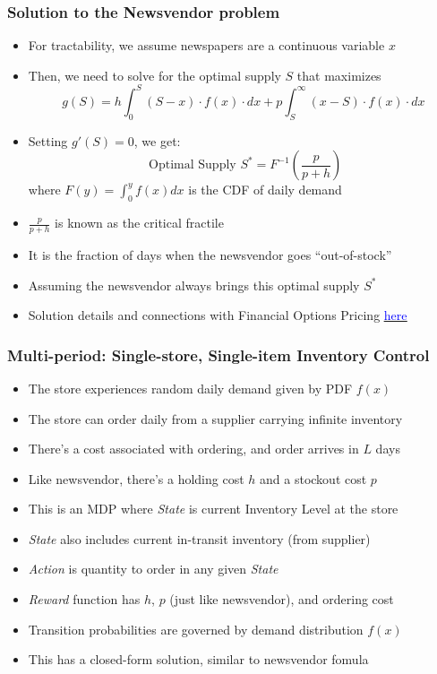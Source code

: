 \documentclass[handout]{beamer}
\begin{document}
\begin{frame}
\frametitle{Solution to the Newsvendor problem}
\pause
\begin{itemize}[<+->]
\item For tractability, we assume newspapers are a continuous variable $x$
\item Then, we need to solve for the optimal supply $S$ that maximizes
$$g(S) = h \int_0^S (S-x) \cdot f(x) \cdot dx + p \int_S^{\infty} (x-S) \cdot f(x) \cdot dx$$
\item Setting $g'(S) =0$, we get:
$$\mbox{ Optimal Supply } S^* = F^{-1}(\frac p {p+h})$$
where $F(y) = \int_0^y f(x) dx$ is the CDF of daily demand
\item $\frac p {p+h}$ is known as the critical fractile
\item It is the fraction of days when the newsvendor goes ``out-of-stock''
\item Assuming the newsvendor always brings this optimal supply $S^*$
\item Solution details and connections with Financial Options Pricing \href{https://github.com/coverdrive/technical-documents/blob/master/supply_chain/NewsvendorOptionsPricing/NewsvendorOptionsPricing.pdf}{\underline{\textcolor{blue}{here}}}
\end{itemize}
\end{frame}

\begin{frame}
\frametitle{Multi-period: Single-store, Single-item Inventory Control}
\pause
\begin{itemize}[<+->]
\item The store experiences random daily demand given by PDF $f(x)$
\item The store can order daily from a supplier carrying infinite inventory
\item There's a cost associated with ordering, and order arrives in $L$ days
\item Like newsvendor, there's a holding cost $h$ and a stockout cost $p$
\item This is an MDP where {\em State} is current Inventory Level at the store
\item {\em State} also includes current in-transit inventory (from supplier)
\item {\em Action} is quantity to order in any given {\em State}
\item {\em Reward} function has $h$, $p$ (just like newsvendor), and ordering cost
\item Transition probabilities are governed by demand distribution $f(x)$
\item This has a closed-form solution, similar to newsvendor fomula
\end{itemize}
\end{frame}
\end{document}
